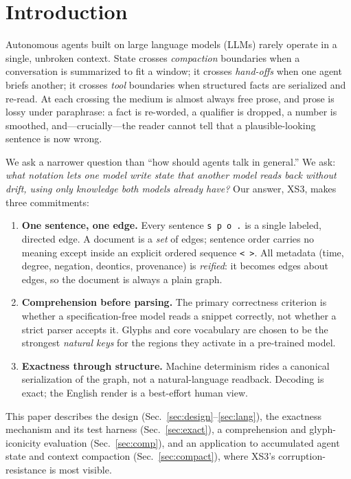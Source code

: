 \documentclass[conference]{IEEEtran}
\newcommand{\code}[1]{\texttt{#1}}
\begin{document}
\section{Introduction}
Autonomous agents built on large language models (LLMs) rarely operate in a
single, unbroken context. State crosses \emph{compaction} boundaries when a
conversation is summarized to fit a window; it crosses \emph{hand-offs} when one
agent briefs another; it crosses \emph{tool} boundaries when structured facts are
serialized and re-read. At each crossing the medium is almost always free prose,
and prose is lossy under paraphrase: a fact is re-worded, a qualifier is
dropped, a number is smoothed, and---crucially---the reader cannot tell that a
plausible-looking sentence is now wrong.

We ask a narrower question than ``how should agents talk in general.'' We ask:
\emph{what notation lets one model write state that another model reads back
without drift, using only knowledge both models already have?} Our answer, XS3,
makes three commitments:

\begin{enumerate}
\item \textbf{One sentence, one edge.} Every sentence \code{s p o .} is a single
labeled, directed edge. A document is a \emph{set} of edges; sentence order
carries no meaning except inside an explicit ordered sequence \code{< >}. All
metadata (time, degree, negation, deontics, provenance) is \emph{reified}: it
becomes edges about edges, so the document is always a plain graph.
\item \textbf{Comprehension before parsing.} The primary correctness criterion is
whether a specification-free model reads a snippet correctly, not whether a strict
parser accepts it. Glyphs and core vocabulary are chosen to be the strongest
\emph{natural keys} for the regions they activate in a pre-trained model.
\item \textbf{Exactness through structure.} Machine determinism rides a canonical
serialization of the graph, not a natural-language readback. Decoding is exact;
the English render is a best-effort human view.
\end{enumerate}

This paper describes the design (Sec.~\ref{sec:design}--\ref{sec:lang}), the
exactness mechanism and its test harness (Sec.~\ref{sec:exact}), a comprehension
and glyph-iconicity evaluation (Sec.~\ref{sec:comp}), and an application to
accumulated agent state and context compaction (Sec.~\ref{sec:compact}), where
XS3's corruption-resistance is most visible.
\end{document}

